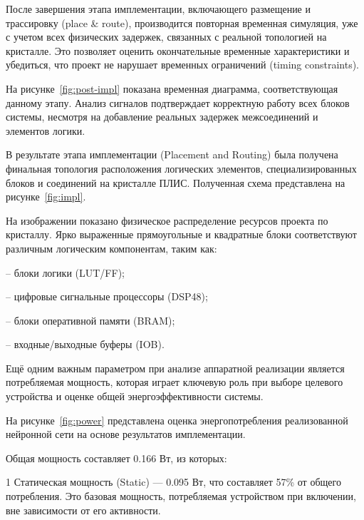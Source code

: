 
После завершения этапа имплементации, включающего размещение и трассировку 
(place \& route), производится повторная временная симуляция, уже с учетом всех 
физических задержек, связанных с реальной топологией на кристалле. Это 
позволяет оценить окончательные временные характеристики и убедиться, что 
проект не нарушает временных ограничений (timing constraints).

На рисунке~\ref{fig:post-impl} показана временная диаграмма, соответствующая 
данному этапу. Анализ сигналов подтверждает корректную работу всех блоков 
системы, несмотря на добавление реальных задержек межсоединений и элементов 
логики.


В результате этапа имплементации (Placement and Routing) была получена 
финальная топология расположения логических элементов, специализированных 
блоков и соединений на кристалле ПЛИС. Полученная схема представлена на 
рисунке~\ref{fig:impl}.


На изображении показано физическое распределение ресурсов проекта по кристаллу. 
Ярко выраженные прямоугольные и квадратные блоки соответствуют различным 
логическим компонентам, таким как:

– блоки логики (LUT/FF);

– цифровые сигнальные процессоры (DSP48);

– блоки оперативной памяти (BRAM);

– входные/выходные буферы (IOB).

Ещё одним важным параметром при анализе аппаратной реализации является 
потребляемая мощность, которая играет ключевую роль при выборе целевого 
устройства и оценке общей энергоэффективности системы.

На рисунке~\ref{fig:power} представлена оценка энергопотребления 
реализованной нейронной сети на основе результатов имплементации.


Общая мощность составляет 0.166 Вт, из которых:

1 Статическая мощность (Static) — 0.095 Вт, что составляет 57\% от общего 
потребления. Это базовая мощность, потребляемая устройством при включении, вне 
зависимости от его активности.

